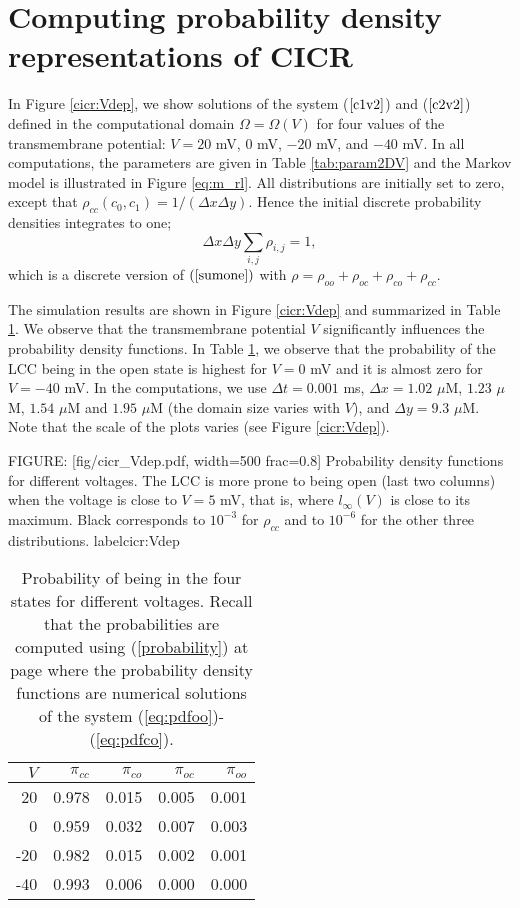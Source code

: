 \section{Computing probability density representations of CICR}

 In Figure \ref{cicr:Vdep}, we show solutions of the system ($\ref{c1v2}$) and ($\ref{c2v2}$) defined in the computational domain
 $\Omega=\Omega(V)$ for four values of the transmembrane potential: $V = 20$ mV, $0$ mV, $-20$ mV, and $-40$ mV. In all computations, the parameters are given in Table \ref{tab:param2DV} and the Markov model is illustrated in Figure \ref{eq:m_rl}.
All distributions are initially set to zero, except that $\rho_{cc}(c_0,c_1)= 1/(\Delta x \Delta y)$. Hence the initial discrete probability densities integrates to one;
\begin{equation}
\Delta x \Delta y \sum_{i,j}  \rho_{i,j}=1,  %
\end{equation}
which is a discrete version of $(\ref{sumone})$ with $\rho=\rho_{oo}+\rho_{oc}+\rho_{co}+\rho_{cc}$.

The simulation results are shown in Figure \ref{cicr:Vdep}  and summarized in Table \ref{tab:stat2DV}. We observe that the transmembrane potential $V$ significantly influences the probability density functions. In Table \ref{tab:stat2DV}, we observe that the probability of the LCC being in the open state is highest for $V=0$ mV and it is almost zero for $V=-40$ mV. In the computations, we use $\Delta t=0.001$ ms, $\Delta x=1.02$ $\mu$M, $1.23$ $\mu$M, $1.54$ $\mu$M and $1.95$ $\mu$M (the domain size varies with $V$), and $\Delta y=9.3$ $\mu$M. Note that the scale of the plots varies (see Figure \ref{cicr:Vdep}).


FIGURE: [fig/cicr_Vdep.pdf, width=500 frac=0.8] Probability density functions for different voltages. The LCC is more prone to being open (last two columns) when the voltage is close to $V=5$ mV, that is, where $l_{\infty}(V)$ is close to its maximum. Black corresponds to $10^{-3}$ for $\rho_{cc}$ and to $10^{-6}$ for the other three distributions. label{cicr:Vdep}

\begin{table}  \begin{center}
\begin{tabular}{|r|r|r|r|r|} \hline
 $V$ & $\pi_{cc}$ & $\pi_{co}$ & $\pi_{oc}$ & $\pi_{oo}$ \\ \hline
20 & 0.978 & 0.015 & 0.005 & 0.001 \\ \hline
0 & 0.959 & 0.032 & 0.007 & 0.003 \\ \hline
-20 & 0.982 & 0.015 & 0.002 & 0.001 \\ \hline
-40 & 0.993 & 0.006 & 0.000 & 0.000 \\ \hline
\end{tabular} \end{center}
\caption{Probability of being in the four states for different voltages. Recall that the probabilities are computed
using  (\ref{probability}) at page \pageref{probability} where the probability density functions are numerical solutions
of the system (\ref{eq:pdfoo})-(\ref{eq:pdfco}).}
\label{tab:stat2DV}
\end{table}




